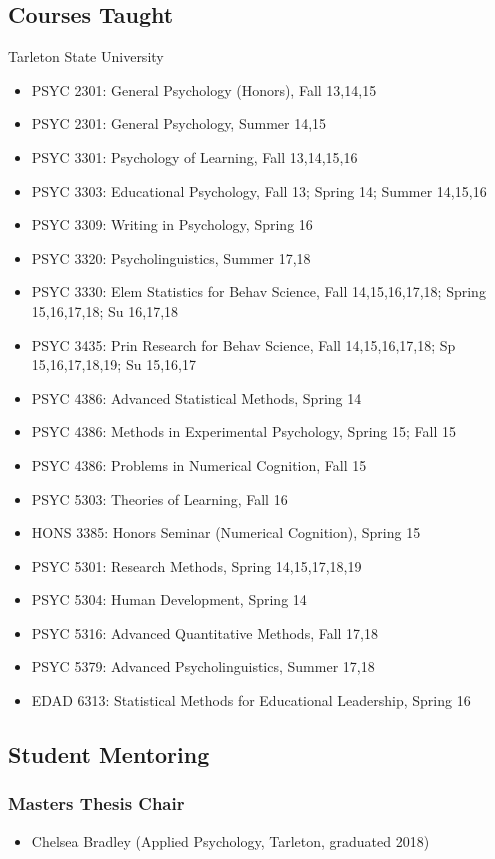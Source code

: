 \documentclass[article,10pt]{article}
\begin{document}
\subsection*{Courses Taught}
\label{sec:orgb5235ad}

Tarleton State University

\begin{itemize}
\item PSYC 2301: General Psychology (Honors), Fall 13,14,15
\item PSYC 2301: General Psychology, Summer 14,15
\item PSYC 3301: Psychology of Learning, Fall 13,14,15,16
\item PSYC 3303: Educational Psychology, Fall 13; Spring 14; Summer 14,15,16
\item PSYC 3309: Writing in Psychology, Spring 16
\item PSYC 3320: Psycholinguistics, Summer 17,18
\item PSYC 3330: Elem Statistics for Behav Science, Fall 14,15,16,17,18; Spring 15,16,17,18; Su 16,17,18
\item PSYC 3435: Prin Research for Behav Science, Fall 14,15,16,17,18; Sp 15,16,17,18,19; Su 15,16,17
\item PSYC 4386: Advanced Statistical Methods, Spring 14
\item PSYC 4386: Methods in Experimental Psychology, Spring 15; Fall 15
\item PSYC 4386: Problems in Numerical Cognition, Fall 15
\item PSYC 5303: Theories of Learning, Fall 16
\item HONS 3385: Honors Seminar (Numerical Cognition), Spring 15
\item PSYC 5301: Research Methods, Spring 14,15,17,18,19
\item PSYC 5304: Human Development, Spring 14
\item PSYC 5316: Advanced Quantitative Methods, Fall 17,18
\item PSYC 5379: Advanced Psycholinguistics, Summer 17,18
\item EDAD 6313: Statistical Methods for Educational Leadership, Spring 16
\end{itemize}

\subsection*{Student Mentoring}
\label{sec:orgab7c16d}

\subsubsection*{Masters Thesis Chair}
\label{sec:orgdacbd4e}
\begin{itemize}
\item Chelsea Bradley (Applied Psychology, Tarleton, graduated 2018)
\end{itemize}
\end{document}
